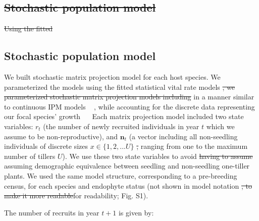 \documentclass[lineno,sn-nature]{sn-jnl}%
\providecommand{\DIFadd}[1]{{\protect\color{blue}#1}} %
\providecommand{\DIFdel}[1]{{\protect\color{red}\protect\scriptsize\sout{#1}}}
\providecommand{\DIFadd}[1]{{\protect\color{blue}\uwave{#1}}} %
\providecommand{\DIFdel}[1]{{\protect\color{red}\sout{#1}}}                      %
\providecommand{\DIFaddbegin}{} %
\providecommand{\DIFaddend}{} %
\providecommand{\DIFdelbegin}{} %
\providecommand{\DIFdelend}{} %
\newcommand{\DIFscaledelfig}{0.5}
\newlength{\DIFdelgraphicswidth} %
\newlength{\DIFdelgraphicsheight} %
\newcommand{\DIFaddincludegraphics}[2][]{{\color{blue}\fbox{\DIFOincludegraphics[#1]{#2}}}} %
\newcommand{\DIFdelincludegraphics}[2][]{%
\sbox{\DIFdelgraphicsbox}{\DIFOincludegraphics[#1]{#2}}%
\settoboxwidth{\DIFdelgraphicswidth}{\DIFdelgraphicsbox} %
\settoboxtotalheight{\DIFdelgraphicsheight}{\DIFdelgraphicsbox} %
\scalebox{\DIFscaledelfig}{%
\parbox[b]{\DIFdelgraphicswidth}{\usebox{\DIFdelgraphicsbox}\\[-\baselineskip] \rule{\DIFdelgraphicswidth}{0em}}\llap{\resizebox{\DIFdelgraphicswidth}{\DIFdelgraphicsheight}{%
\setlength{\unitlength}{\DIFdelgraphicswidth}%
\begin{picture}(1,1)%
\thicklines\linethickness{2pt} %
{\color[rgb]{1,0,0}\put(0,0){\framebox(1,1){}}}%
{\color[rgb]{1,0,0}\put(0,0){\line( 1,1){1}}}%
{\color[rgb]{1,0,0}\put(0,1){\line(1,-1){1}}}%
\end{picture}%
}\hspace*{3pt}}} %
} %
\DeclareRobustCommand{\DIFaddbegin}{\DIFOaddbegin \let\includegraphics\DIFaddincludegraphics} %
\DeclareRobustCommand{\DIFaddend}{\DIFOaddend \let\includegraphics\DIFOincludegraphics} %
\DeclareRobustCommand{\DIFdelbegin}{\DIFOdelbegin \let\includegraphics\DIFdelincludegraphics} %
\DeclareRobustCommand{\DIFdelend}{\DIFOaddend \let\includegraphics\DIFOincludegraphics} %
\begin{document}
	\DIFdelbegin \subsection*{\DIFdel{Stochastic population model}}
\DIFdel{Using the fitted }\DIFdelend \DIFaddbegin \subsection*{\DIFadd{Stochastic population model}}
	\DIFadd{We built stochastic matrix projection model for each host species. 
	We parameterized the models using the fitted statistical }\DIFaddend vital rate models \DIFdelbegin \DIFdel{, we parameterized stochastic matrix projection models including }\DIFdelend \DIFaddbegin \DIFadd{in a manner similar to continuous IPM models \mbox{%
\cite{ellner2016data}}\hspace{0pt}%
, while accounting for the discrete data representing our focal species' growth \mbox{%
\cite{ellner2022critical}
	}\hspace{0pt}%
Each matrix projection model included }\DIFaddend two state variables: $r_{t}$ (the number of newly recruited individuals in year $t$ \DIFaddbegin \DIFadd{which we assume to be non-reproductive}\DIFaddend ), and $\textbf{n}_{t}$ (a vector including all non-seedling individuals of \DIFaddbegin \DIFadd{discrete }\DIFaddend sizes $x\in\{1,2,...U\}$ \DIFdelbegin \DIFdel{, }\DIFdelend ranging from one to the maximum number of tillers $U$\DIFaddbegin \DIFadd{)}\DIFaddend . 
	We use these two state variables to avoid \DIFdelbegin \DIFdel{having to assume }\DIFdelend \DIFaddbegin \DIFadd{assuming }\DIFaddend demographic equivalence between seedling and non-seedling one-tiller plants. 
	We used the same model structure\DIFaddbegin \DIFadd{, corresponding to a pre-breeding census, }\DIFaddend for each species and endophyte status (not shown in model notation \DIFdelbegin \DIFdel{, to make it more readable}\DIFdelend \DIFaddbegin \DIFadd{for readability; Fig. S1}\DIFaddend ). 

	The number of recruits in year $t+1$ is given by:
\end{document}
